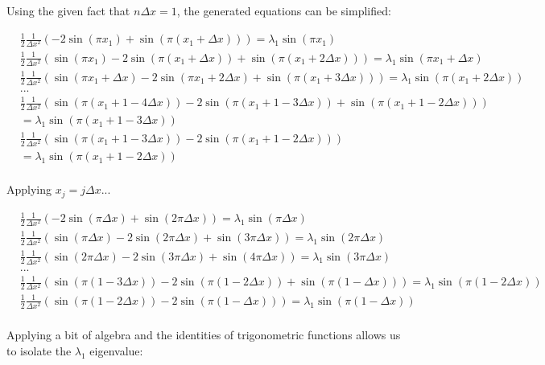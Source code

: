 \documentclass{article}
\begin{document}
	Using the given fact that $n\Delta x=1$, the generated equations can be simplified:
	
	\begin{align*}
		&\frac{1}{2}\frac{1}{\Delta x^{2}}(-2\sin(\pi x_{1})+\sin(\pi(x_{1}+\Delta x)))=\lambda_{1}\sin(\pi x_{1})\\
		&\frac{1}{2}\frac{1}{\Delta x^{2}}(\sin(\pi x_{1})-2\sin(\pi (x_{1}+\Delta x))+\sin(\pi(x_{1}+2\Delta x)))=\lambda_{1}\sin(\pi x_{1}+\Delta x)\\
		&\frac{1}{2}\frac{1}{\Delta x^{2}}(\sin(\pi x_{1}+\Delta x)-2\sin(\pi x_{1}+2\Delta x)+\sin(\pi(x_{1}+3\Delta x)))=\lambda_{1}\sin(\pi (x_{1}+2\Delta x))\\
		&...\\
		&\frac{1}{2}\frac{1}{\Delta x^{2}}(\sin(\pi(x_{1}+1-4\Delta x))-2\sin(\pi(x_{1}+1-3\Delta x))+\sin(\pi(x_{1}+1-2\Delta x)))\\&=\lambda_{1}\sin(\pi(x_{1}+1-3\Delta x))\\
		&\frac{1}{2}\frac{1}{\Delta x^{2}}(\sin(\pi(x_{1}+1-3\Delta x))-2\sin(\pi(x_{1}+1-2\Delta x)))\\&=\lambda_{1}\sin(\pi(x_{1}+1-2\Delta x))\\
	\end{align*}
	
	Applying $x_{j}=j\Delta x$...
	
	\begin{align*}
		&\frac{1}{2}\frac{1}{\Delta x^{2}}(-2\sin(\pi \Delta x)+\sin(2\pi\Delta x))=\lambda_{1}\sin(\pi\Delta x)\\
		&\frac{1}{2}\frac{1}{\Delta x^{2}}(\sin(\pi \Delta x)-2\sin(2\pi\Delta x)+\sin(3\pi\Delta x))=\lambda_{1}\sin(2\pi\Delta x)\\
		&\frac{1}{2}\frac{1}{\Delta x^{2}}(\sin(2\pi\Delta x)-2\sin(3\pi\Delta x)+\sin(4\pi\Delta x))=\lambda_{1}\sin(3\pi\Delta x)\\
		&...\\
		&\frac{1}{2}\frac{1}{\Delta x^{2}}(\sin(\pi(1-3\Delta x))-2\sin(\pi(1-2\Delta x))+\sin(\pi(1-\Delta x)))=\lambda_{1}\sin(\pi(1-2\Delta x))\\
		&\frac{1}{2}\frac{1}{\Delta x^{2}}(\sin(\pi(1-2\Delta x))-2\sin(\pi(1-\Delta x)))=\lambda_{1}\sin(\pi(1-\Delta x))\\
	\end{align*}
	
	Applying a bit of algebra and the identities of trigonometric functions allows us to isolate the $\lambda_{1}$ eigenvalue:
	
\end{document}
